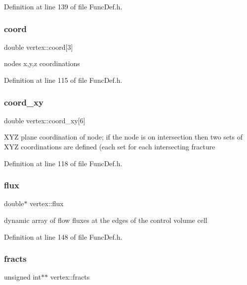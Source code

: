 Definition at line 139 of file Func\+Def.\+h.

\mbox{\label{structvertex_a1eff0deab63f96c97ba5098608d65ad3}} 
\subsubsection{\texorpdfstring{coord}{coord}}
{\footnotesize\ttfamily double vertex\+::coord\mbox{[}3\mbox{]}}

node\textquotesingle{}s x,y,z coordinations 

Definition at line 115 of file Func\+Def.\+h.

\mbox{\label{structvertex_a3473aebf2ce957df8c02095cc98ebb39}} 
\subsubsection{\texorpdfstring{coord\_xy}{coord\_xy}}
{\footnotesize\ttfamily double vertex\+::coord\+\_\+xy\mbox{[}6\mbox{]}}

X\+YZ plane coordination of node; if the node is on intersection then two sets of X\+YZ coordinations are defined (each set for each intersecting fracture 

Definition at line 118 of file Func\+Def.\+h.

\mbox{\label{structvertex_a9934ed428ad1db71c9aa1e601649791c}} 
\subsubsection{\texorpdfstring{flux}{flux}}
{\footnotesize\ttfamily double$\ast$ vertex\+::flux}

dynamic array of flow fluxes at the edges of the control volume cell 

Definition at line 148 of file Func\+Def.\+h.

\mbox{\label{structvertex_adc1951216db706914f5963da2e58accc}} 
\subsubsection{\texorpdfstring{fracts}{fracts}}
{\footnotesize\ttfamily unsigned int$\ast$$\ast$ vertex\+::fracts}

